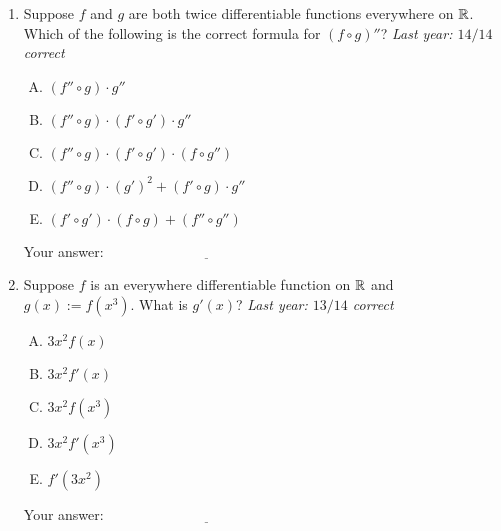 \documentclass[10pt]{amsart}
\begin{document}
\begin{enumerate}
  {\bf PLEASE TURN OVER FOR THE THIRD AND FOURTH QUESTION.}

\newpage
\item Suppose $f$ and $g$ are both twice differentiable functions
  everywhere on $\mathbb{R}$. Which of the following is the correct formula
  for $(f \circ g)''$? {\em Last year: $14/14$ correct}

  \begin{enumerate}[(A)]

  \item $(f'' \circ g) \cdot g''$
  \item $(f'' \circ g) \cdot (f' \circ g') \cdot g''$
  \item $(f'' \circ g) \cdot (f' \circ g') \cdot (f \circ g'')$
  \item $(f'' \circ g) \cdot (g')^2 + (f' \circ g) \cdot g''$
  \item $(f' \circ g') \cdot (f \circ g) + (f'' \circ g'')$
  \end{enumerate}

  \vspace{0.1in}
  Your answer: $\underline{\qquad\qquad\qquad\qquad\qquad\qquad\qquad}$
  \vspace{1.5in}

\item Suppose $f$ is an everywhere differentiable function on $\mathbb{R}$ and
  $g(x) := f(x^3)$. What is $g'(x)$? {\em Last year: $13/14$ correct}

  \begin{enumerate}[(A)]
  \item $3x^2f(x)$
  \item $3x^2f'(x)$
  \item $3x^2f(x^3)$
  \item $3x^2f'(x^3)$
  \item $f'(3x^2)$
  \end{enumerate}

  \vspace{0.1in}
  Your answer: $\underline{\qquad\qquad\qquad\qquad\qquad\qquad\qquad}$
  \vspace{1.5in}
\end{enumerate}
\end{document}
